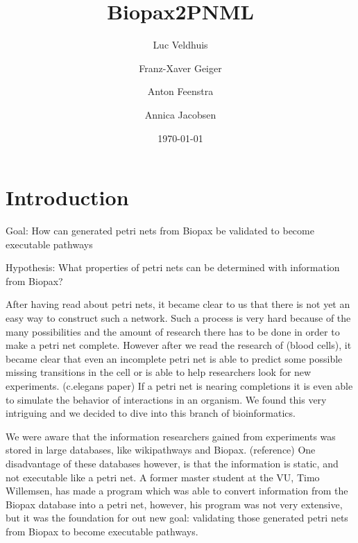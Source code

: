 \documentclass[12pt,a4paper,draft]{article}
\author{Luc Veldhuis \and Franz-Xaver Geiger \and Anton Feenstra \and Annica Jacobsen}
\title{Biopax2PNML}
\date{\today}
\begin{document}
    \maketitle
    
    \listoftodos
    
    \pagebreak
    
\section{Introduction}\label{sec:introduction}   


    Goal: 
    How can generated petri nets from Biopax be validated to become executable pathways
    
    Hypothesis:
    What properties of petri nets can be determined with information from Biopax?
     
    
    After having read about petri nets, it became clear to us that there is not yet an easy way to construct such a network. Such a process is very hard because of the many possibilities and the amount of research there has to be done in order to make a petri net complete. However after we read the research of (blood cells), it became clear that even an incomplete petri net is able to predict some possible missing transitions in the cell or is able to help researchers look for new experiments.
    (c.elegans paper)
    If a petri net is nearing completions it is even able to simulate the behavior of interactions in an organism. We found this very intriguing and we decided to dive into this branch of bioinformatics. 
    
    We were aware that the information researchers gained from experiments was stored in large databases, like wikipathways and Biopax. (reference) One disadvantage of these databases however, is that the information is static, and not executable like a petri net. A former master student at the VU, Timo Willemsen, has made a program which was able to convert information from the Biopax database into a petri net, however, his program was not very extensive, but it was the foundation for out new goal: validating those generated petri nets from Biopax to become executable pathways.
    
\end{document}
